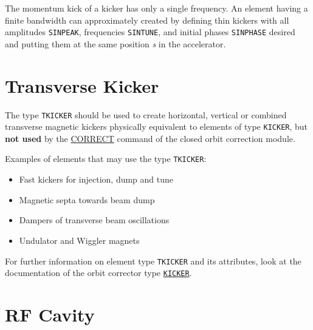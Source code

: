 The momentum kick of a kicker has only a single frequency. An element
having a finite bandwidth can approximately created by defining  thin
kickers with all amplitudes \texttt{SINPEAK}, frequencies
\texttt{SINTUNE}, and initial phases \texttt{SINPHASE} desired and
putting them at the same position \textit{s} in the accelerator.



\section{Transverse Kicker}
\label{sec:tkicker}

The type \texttt{TKICKER} should be used to create horizontal, vertical or
combined transverse magnetic kickers physically equivalent to elements of type
\texttt{KICKER}, but \textbf{not used} by the \hyperref[sec:correct]{CORRECT}
command of the closed orbit correction module.

Examples of elements that may use the type \texttt{TKICKER}:
\begin{itemize}
   \item Fast kickers for injection, dump and tune
   \item Magnetic septa towards beam dump
   \item Dampers of transverse beam oscillations
   \item Undulator and Wiggler magnets
\end{itemize}

For further information on element type \texttt{TKICKER} and its attributes, look
at the documentation of the orbit corrector type
\hyperref[sec:kicker]{\texttt{KICKER}}.


\section{RF Cavity}
\label{sec:rf-cavity}\label{sec:rfcavity}


